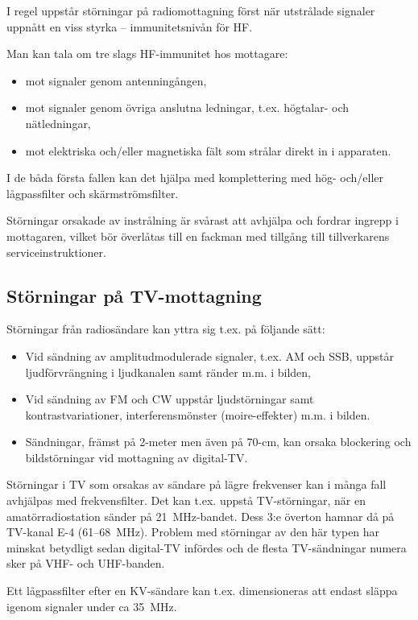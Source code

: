 I regel uppstår störningar på radiomottagning först när utstrålade signaler
uppnått en viss styrka -- immunitetsnivån för HF.

Man kan tala om tre slags HF-immunitet hos mottagare:
\begin{itemize}
\item mot signaler genom antenningången,
\item mot signaler genom övriga anslutna ledningar, t.ex. högtalar-
  och nätledningar,
\item mot elektriska och/eller magnetiska fält som strålar direkt in i
  apparaten.
\end{itemize}

I de båda första fallen kan det hjälpa med komplettering med hög- och/eller
lågpassfilter och skärmströmsfilter.

Störningar orsakade av instrålning är svårast att avhjälpa och fordrar ingrepp i
mottagaren, vilket bör överlåtas till en fackman med tillgång till
tillverkarens serviceinstruktioner.

\subsection{Störningar på TV-mottagning}

Störningar från radiosändare kan yttra sig t.ex. på följande sätt:
\begin{itemize}
\item Vid sändning av amplitudmodulerade signaler, t.ex. AM och SSB,
  uppstår ljudförvrängning i ljudkanalen samt ränder m.m. i bilden,
\item Vid sändning av FM och CW uppstår ljudstörningar samt
  kontrastvariationer, interferensmönster (moire-effekter) m.m. i
  bilden.
\item Sändningar, främst på 2-meter men även på 70-cm, kan orsaka blockering och
bildstörningar vid mottagning av digital-TV.
\end{itemize}

Störningar i TV som orsakas av sändare på lägre frekvenser kan i många fall
avhjälpas med frekvensfilter.
Det kan t.ex. uppstå TV-störningar, när en amatörradiostation sänder på 21~MHz-bandet.
Dess 3:e överton hamnar då på TV-kanal E-4 (61--68~MHz).
Problem med störningar av den här typen har minskat betydligt sedan digital-TV
infördes och de flesta TV-sändningar numera sker på VHF- och UHF-banden.

Ett lågpassfilter efter en KV-sändare kan t.ex. dimensioneras att endast släppa
igenom signaler under ca 35~MHz.

